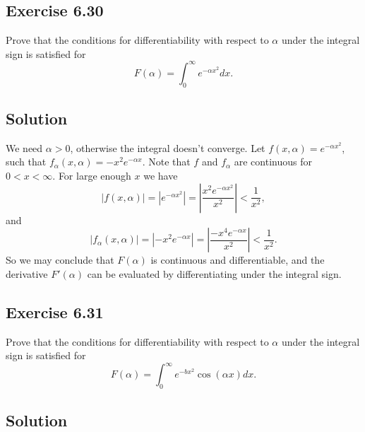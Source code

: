 \subsection*{Exercise 6.30}

Prove that the conditions for differentiability with respect to $\alpha$ under the integral sign is satisfied for
\begin{equation*}
    F(\alpha) = \int_0^{\infty} e^{-\alpha x^2} dx.
\end{equation*}

\subsection*{Solution}

We need $\alpha > 0$, otherwise the integral doesn't converge.
Let $f(x, \alpha) = e^{-\alpha x^2}$, such that $f_{\alpha}(x, \alpha) = -x^2 e^{-\alpha x}$.
Note that $f$ and $f_{\alpha}$ are continuous for $0 < x < \infty$.
For large enough $x$ we have
\begin{equation*}
    |f(x, \alpha)| = |e^{-\alpha x^2}| = \left| \frac{x^2 e^{-\alpha x^2}}{x^2} \right| < \frac{1}{x^2},
\end{equation*}
and
\begin{equation*}
    |f_{\alpha}(x, \alpha)| = |-x^2 e^{-\alpha x}| = \left| \frac{-x^4 e^{-\alpha x}}{x^2} \right| < \frac{1}{x^2}.
\end{equation*}
So we may conclude that $F(\alpha)$ is continuous and differentiable, and the derivative $F'(\alpha)$ can be evaluated by differentiating under the integral sign.


\subsection*{Exercise 6.31}

Prove that the conditions for differentiability with respect to $\alpha$ under the integral sign is satisfied for
\begin{equation*}
    F(\alpha) = \int_{0}^{\infty} e^{-bx^2} \cos(\alpha x) dx.
\end{equation*}

\subsection*{Solution}

